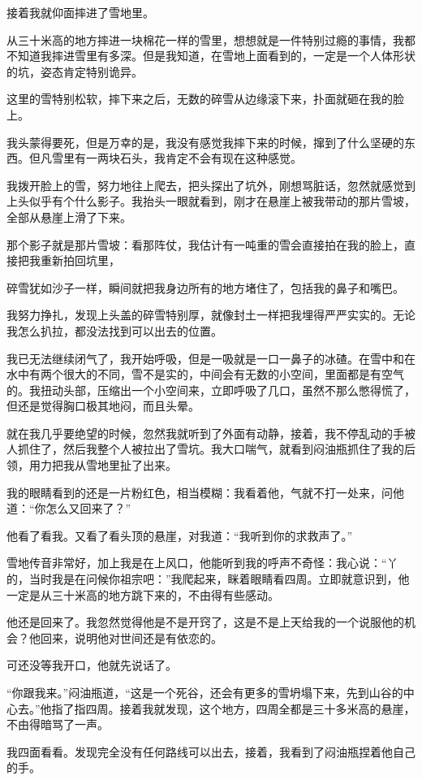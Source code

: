 接着我就仰面摔进了雪地里。

从三十米高的地方摔进一块棉花一样的雪里，想想就是一件特别过瘾的事情，我都不知道我摔进雪里有多深。但是我知道，在雪地上面看到的，一定是一个人体形状的坑，姿态肯定特别诡异。

这里的雪特别松软，摔下来之后，无数的碎雪从边缘滚下来，扑面就砸在我的脸上。

我头蒙得要死，但是万幸的是，我没有感觉我摔下来的时候，撺到了什么坚硬的东西。但凡雪里有一两块石头，我肯定不会有现在这种感觉。

我拨开脸上的雪，努力地往上爬去，把头探出了坑外，刚想骂脏话，忽然就感觉到上头似乎有个什么影子。我抬头一眼就看到，刚才在悬崖上被我带动的那片雪坡，全部从悬崖上滑了下来。

那个影子就是那片雪坡：看那阵仗，我估计有一吨重的雪会直接拍在我的脸上，直接把我重新拍回坑里，

碎雪犹如沙子一样，瞬间就把我身边所有的地方堵住了，包括我的鼻子和嘴巴。

我努力挣扎，发现上头盖的碎雪特别厚，就像封土一样把我埋得严严实实的。无论我怎么扒拉，都没法找到可以出去的位置。

我已无法继续闭气了，我开始呼吸，但是一吸就是一口一鼻子的冰碴。在雪中和在水中有两个很大的不同，雪不是实的，中间会有无数的小空间，里面都是有空气的。我扭动头部，压缩出一个小空间来，立即呼吸了几口，虽然不那么憋得慌了，但还是觉得胸口极其地闷，而且头晕。

就在我几乎要绝望的时候，忽然我就听到了外面有动静，接着，我不停乱动的手被人抓住了，然后我整个人被拉出了雪坑。我大口喘气，就看到闷油瓶抓住了我的后领，用力把我从雪地里扯了出来。

我的眼睛看到的还是一片粉红色，相当模糊：我看着他，气就不打一处来，问他道：“你怎么又回来了？”

他看了看我。又看了看头顶的悬崖，对我道：“我听到你的求救声了。”

雪地传音非常好，加上我是在上风口，他能听到我的呼声不奇怪：我心说：“丫的，当时我是在问候你祖宗吧：”我爬起来，眯着眼睛看四周。立即就意识到，他一定是从三十米高的地方跳下来的，不由得有些感动。

他还是回来了。我忽然觉得他是不是开窍了，这是不是上天给我的一个说服他的机会？他回来，说明他对世间还是有依恋的。

可还没等我开口，他就先说话了。

“你跟我来。”闷油瓶道，“这是一个死谷，还会有更多的雪坍塌下来，先到山谷的中心去。”他指了指四周。接着我就发现，这个地方，四周全都是三十多米高的悬崖，不由得暗骂了一声。

我四面看看。发现完全没有任何路线可以出去，接着，我看到了闷油瓶捏着他自己的手。

